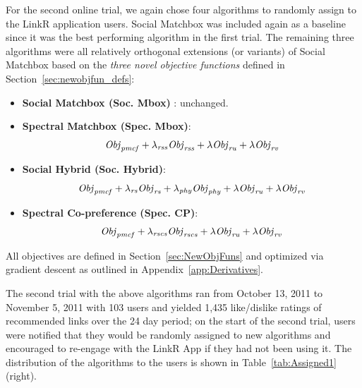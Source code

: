 For the second online trial, we again chose four algorithms to
randomly assign to the LinkR application users.  Social Matchbox
was included again as a baseline since it was the best performing
algorithm in the first trial.  The remaining three algorithms
were all relatively orthogonal extensions (or variants) of Social Matchbox
based on the \emph{three novel objective functions} defined in 
Section~\ref{sec:newobjfun_defs}:
\begin{itemize}
\item {\bf Social Matchbox (Soc. Mbox)} : unchanged.
\item {\bf Spectral Matchbox (Spec. Mbox)}: 
$$\mathit{Obj}_{\mathit{pmcf}} + \lambda_{\mathit{rss}} \mathit{Obj}_{\mathit{rss}} + \lambda \mathit{Obj}_{\mathit{ru}} + \lambda \mathit{Obj}_{\mathit{rv}}$$
\item {\bf Social Hybrid (Soc. Hybrid)}: 
$$\mathit{Obj}_{\mathit{pmcf}} + \lambda_{\mathit{rs}} \mathit{Obj}_{\mathit{rs}} + \lambda_{\mathit{phy}} \mathit{Obj}_{\mathit{phy}} + \lambda \mathit{Obj}_{\mathit{ru}} + \lambda \mathit{Obj}_{\mathit{rv}}$$
\item {\bf Spectral Co-preference (Spec. CP)}: 
$$\mathit{Obj}_{\mathit{pmcf}} + \lambda_{\mathit{rscs}} \mathit{Obj}_{\mathit{rscs}} + \lambda \mathit{Obj}_{\mathit{ru}} + \lambda \mathit{Obj}_{\mathit{rv}}$$
\end{itemize}
All objectives are defined in Section~\ref{sec:NewObjFuns} 
and optimized via gradient descent as outlined
in Appendix~\ref{app:Derivatives}.  

The second trial with the above algorithms ran from October 13, 2011
to November 5, 2011 with 103 users and yielded 1,435 like/dislike
ratings of recommended links over the 24 day period; on the start of
the second trial, users were notified that they would be randomly
assigned to new algorithms and encouraged to re-engage with the LinkR
App if they had not been using it.  The distribution of the algorithms
to the users is shown in Table~\ref{tab:Assigned1} (right).


